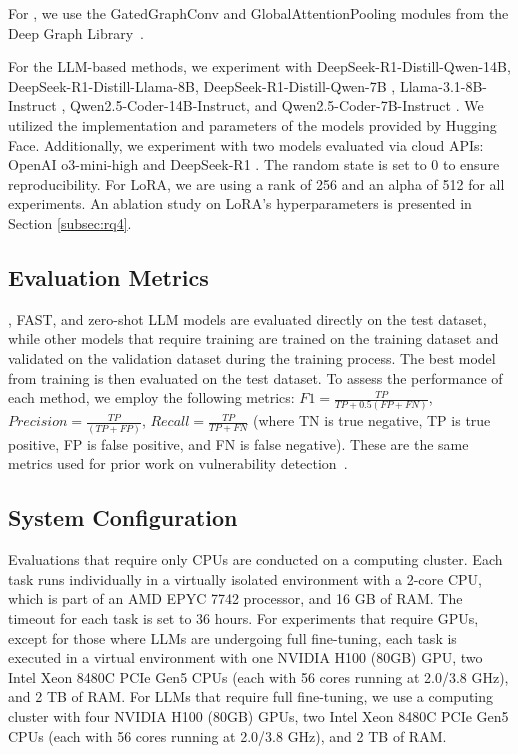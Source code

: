 \documentclass[12pt,openany,oneside,table]{cmuthesis}
\begin{document}
For , we use the GatedGraphConv and GlobalAttentionPooling modules from the Deep Graph Library~\cite{wang2019deep}.

For the LLM-based methods, we experiment with 
DeepSeek-R1-Distill-Qwen-14B, DeepSeek-R1-Distill-Llama-8B, DeepSeek-R1-Distill-Qwen-7B \cite{deepseek2025deepseek}, Llama-3.1-8B-Instruct \cite{dubey2024llama}, Qwen2.5-Coder-14B-Instruct, and Qwen2.5-Coder-7B-Instruct \cite{qwen2.5}. We utilized the implementation and parameters of the models provided by Hugging Face. Additionally, we experiment with two models evaluated via cloud APIs: OpenAI o3-mini-high and DeepSeek-R1 \cite{deepseek2025deepseek}. The random state is set to 0 to ensure reproducibility.
For LoRA, we are using a rank of 256 and an alpha of 512 for all experiments. An ablation study on LoRA's hyperparameters is presented in Section \ref{subsec:rq4}.

\subsection{Evaluation Metrics}\label{subsec:experiment_metrics}

\nodemedicfine, FAST, and zero-shot LLM models are evaluated directly on the test dataset, while other models that require training are trained on the training dataset and validated on the validation dataset during the training process. The best model from training is then evaluated on the test dataset.
To assess the performance of each method, we employ the following metrics: $F1 = \frac{TP} {TP + 0.5(FP + FN)}$, $Precision = \frac{TP}{(TP + FP)}$, $Recall = \frac{TP}{TP + FN}$ (where TN is true negative, TP is true positive, FP is false positive, and FN is false negative).
These are the same metrics used for prior work on vulnerability detection~\cite{deepdfa, ivdetect, linevul, yang2024security}.

\subsection{System Configuration}\label{subsec:system_config}

Evaluations that require only CPUs are conducted on a computing cluster. Each task runs individually in a virtually isolated environment with a 2-core CPU, which is part of an AMD EPYC 7742 processor, and 16 GB of RAM. The timeout for each task is set to 36 hours. For experiments that require GPUs, except for those where LLMs are undergoing full fine-tuning, each task is executed in a virtual environment with one NVIDIA H100 (80GB) GPU, two Intel Xeon 8480C PCIe Gen5 CPUs (each with 56 cores running at 2.0/3.8 GHz), and 2 TB of RAM. For LLMs that require full fine-tuning, we use a computing cluster with four NVIDIA H100 (80GB) GPUs, two Intel Xeon 8480C PCIe Gen5 CPUs (each with 56 cores running at 2.0/3.8 GHz), and 2 TB of RAM. 
\end{document}

